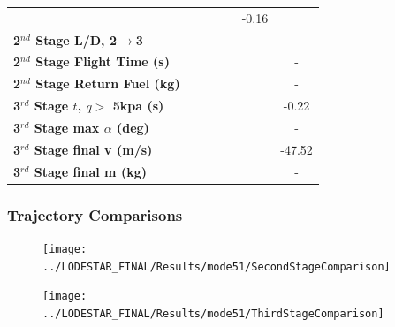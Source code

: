 \begin{table}[ht]
\begin{tabular}{l c c c c c c}
		& \secondthirdSeparationqvCdFifty
		& \secondthirdSeparationqvCdStandard
		& \secondthirdSeparationqvCdOneHundredSeven
		& \secondthirdSeparationqvCdOneHundredFifteen
		&-0.16
		\\
		\textbf{2$^{nd}$ Stage L/D, 2$\rightarrow$3}
		& \secondthirdSeparationLDvCdTwenty
		& \secondthirdSeparationLDvCdFifty
		& \secondthirdSeparationLDvCdStandard
		& \secondthirdSeparationLDvCdOneHundredSeven
		& \secondthirdSeparationLDvCdOneHundredFifteen
		& -
		\\
		\textbf{2$^{nd}$ Stage Flight Time (s)}
		& \secondFlightTimevCdTwenty
		& \secondFlightTimevCdFifty
		& \secondFlightTimevCdStandard
		& \secondFlightTimevCdOneHundredSeven
		& \secondFlightTimevCdOneHundredFifteen
		& -
		\\
		\textbf{2$^{nd}$ Stage Return Fuel (kg)}
		& \returnFuelvCdTwenty
		& \returnFuelvCdFifty
		& \returnFuelvCdStandard
		& \returnFuelvCdOneHundredSeven
		& \returnFuelvCdOneHundredFifteen
		& -
		\\
		\textbf{3$^{rd}$ Stage $t$, $q >$ 5kpa (s)}
		& \thirdqOverFivevCdTwenty
		& \thirdqOverFivevCdFifty
		& \thirdqOverFivevCdStandard
		& \thirdqOverFivevCdOneHundredSeven
		& \thirdqOverFivevCdOneHundredFifteen
		&-0.22
		\\
		\textbf{3$^{rd}$ Stage max $\alpha$ (deg)}
		& \thirdmaxAoAvCdTwenty
		& \thirdmaxAoAvCdFifty
		& \thirdmaxAoAvCdStandard
		& \thirdmaxAoAvCdOneHundredSeven
		& \thirdmaxAoAvCdOneHundredFifteen
		& -
		\\
		\textbf{3$^{rd}$ Stage final v (m/s)}
		& \thirdcircvvCdTwenty
		& \thirdcircvvCdFifty
		& \thirdcircvvCdStandard
		& \thirdcircvvCdOneHundredSeven
		& \thirdcircvvCdOneHundredFifteen
		&-47.52
		\\
		\textbf{3$^{rd}$ Stage final m (kg)}
		& \thirdcircmvCdTwenty
		& \thirdcircmvCdFifty
		& \thirdcircmvCdStandard
		& \thirdcircmvCdOneHundredSeven
		& \thirdcircmvCdOneHundredFifteen
		& -
		\\
		\hline 
	\end{tabular} 
\end{table} 

\subsubsection{Trajectory Comparisons}
\begin{figure}[th]
\centering
\texttt{[image: ../LODESTAR\_FINAL/Results/mode51/SecondStageComparison]}
\caption{}
\label{fig:SecondStageComparison-}
\end{figure}
\begin{figure}[th]
\centering
\texttt{[image: ../LODESTAR\_FINAL/Results/mode51/ThirdStageComparison]}
\caption{}
\label{fig:ThirdStageComparison-}
\end{figure}


